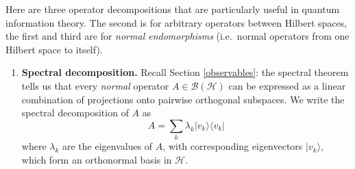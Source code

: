 \documentclass[fleqn]{article}
\begin{document}
Here are three operator decompositions that are particularly useful in quantum information theory.
The second is for arbitrary operators between Hilbert spaces, the first and third are for \emph{normal endomorphisms} (i.e.~normal operators from one Hilbert space to itself).

\begin{enumerate}
\def\labelenumi{\arabic{enumi}.}
\item
  \textbf{Spectral decomposition.}
  Recall Section \ref{observables}: the spectral theorem tells us that every \emph{normal} operator \(A\in\mathcal{B}(\mathcal{H})\) can be expressed as a linear combination of projections onto pairwise orthogonal subspaces.
  We write the spectral decomposition of \(A\) as
  \[
     A = \sum_k \lambda_k |v_k\rangle\langle v_k|
   \]
  where \(\lambda_k\) are the eigenvalues of \(A\), with corresponding eigenvectors \(|v_k\rangle\), which form an orthonormal basis in \(\mathcal{H}\).


\end{enumerate}
\end{document}
